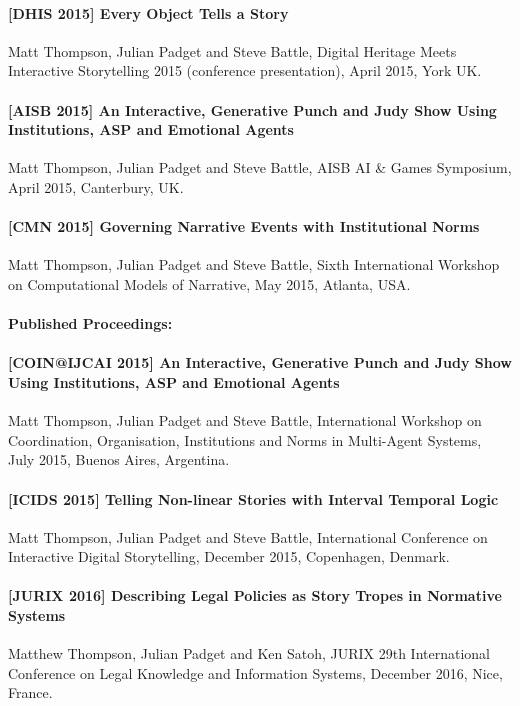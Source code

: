 \documentclass[11pt]{report}
\begin{document}
  \paragraph{[DHIS 2015] Every Object Tells a Story} Matt Thompson, Julian Padget and Steve Battle, Digital Heritage Meets Interactive Storytelling 2015 (conference presentation), April 2015, York UK.\label{pub:dhis}
  \paragraph{[AISB 2015] An Interactive, Generative Punch and Judy Show Using Institutions, ASP and Emotional Agents} Matt Thompson, Julian Padget and Steve Battle, AISB AI \& Games Symposium, April 2015, Canterbury, UK.\label{pub:aisb}
  \paragraph{[CMN 2015] Governing Narrative Events with Institutional Norms} Matt Thompson, Julian Padget and Steve Battle, Sixth International Workshop on Computational Models of Narrative, May 2015, Atlanta, USA.\label{pub:cmn}
  \paragraph{Published Proceedings:}
  \paragraph{[COIN@IJCAI 2015] An Interactive, Generative Punch and Judy Show Using Institutions, ASP and Emotional Agents} Matt Thompson, Julian Padget and Steve Battle, International Workshop on Coordination, Organisation, Institutions and Norms in Multi-Agent Systems, July 2015, Buenos Aires, Argentina.\label{pub:coin}~\citep{thompson2015interactive}
  \paragraph{[ICIDS 2015] Telling Non-linear Stories with Interval Temporal Logic} Matt
  Thompson, Julian Padget and Steve Battle, International Conference on
  Interactive Digital Storytelling, December 2015, Copenhagen, Denmark.\label{pub:icids}~\citep{thompson2015telling}
  \paragraph{[JURIX 2016] Describing Legal Policies as Story Tropes in Normative
    Systems} Matthew Thompson, Julian Padget and Ken Satoh, JURIX 29th
  International Conference on Legal Knowledge and Information Systems, December
  2016, Nice, France.\label{pub:jurix}~\citep{thompson2016describing}
\end{document}
